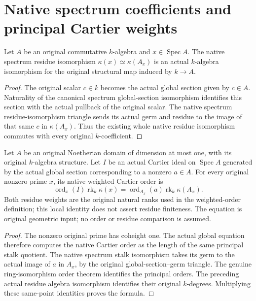 \section{Native spectrum coefficients and principal Cartier weights}

\begin{definition}
\label{def:intrinsic-numerical-spec-native-residue-algebra}
\leanok
Let $A$ be an original commutative $k$-algebra and $x\in\operatorname{Spec}A$.
The native spectrum residue isomorphism
$\kappa(x)\simeq\kappa(A_x)$ is an actual $k$-algebra isomorphism for
the original structural map induced by $k\to A$.
\end{definition}
\begin{proof}
The original scalar $c\in k$ becomes the actual global section given
by $c\in A$. Naturality of the canonical spectrum global-section
isomorphism identifies this section with the actual pullback of the
original scalar. The native spectrum residue-isomorphism triangle
sends its actual germ and residue to the image of that same $c$ in
$\kappa(A_x)$. Thus the existing whole native residue isomorphism
commutes with every original $k$-coefficient.
\end{proof}

\begin{theorem}
\label{thm:intrinsic-numerical-spec-principal-cartier-weight}
\leanok
Let $A$ be an original Noetherian domain of dimension at most one,
with its original $k$-algebra structure. Let $I$ be an actual Cartier
ideal on $\operatorname{Spec}A$ generated by the actual global section
corresponding to a nonzero $a\in A$. For every original nonzero prime
$x$, its native weighted Cartier order is
\[
 \operatorname{ord}_x(I)\operatorname{rk}_k\kappa(x)
 =\operatorname{ord}_{A_x}(a)\operatorname{rk}_k\kappa(A_x).
\]
Both residue weights are the original natural ranks used in the
weighted-order definition; this local identity does not assert residue
finiteness.
The equation is original geometric input; no order or residue comparison
is assumed.
\end{theorem}
\begin{proof}
The nonzero original prime has coheight one. The actual global equation
therefore computes the native Cartier order as the length of the same
principal stalk quotient. The native spectrum stalk isomorphism takes
its germ to the actual image of $a$ in $A_x$, by the original
global-section--germ triangle. The genuine ring-isomorphism order
theorem identifies the principal orders. The preceding actual residue
algebra isomorphism identifies their original $k$-degrees. Multiplying
these same-point identities proves the formula.
\end{proof}

